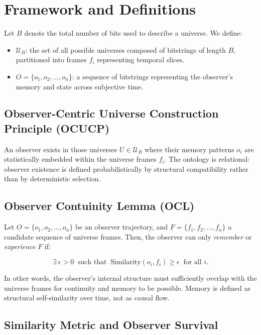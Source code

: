 \documentclass[12pt]{article}
\begin{document}
\section{Framework and Definitions}

Let $B$ denote the total number of bits used to describe a universe. We define:

\begin{itemize}
    \item $\mathcal{U}_B$: the set of all possible universes composed of bitstrings of length $B$, partitioned into frames $f_i$ representing temporal slices.
    \item $O = \{o_1, o_2, \ldots, o_n\}$: a sequence of bitstrings representing the observer's memory and state across subjective time.
\end{itemize}

\subsection{Observer-Centric Universe Construction Principle (OCUCP)}


An observer exists in those universes $U \in \mathcal{U}_B$ where their memory patterns $o_i$ are statistically embedded within the universe frames $f_i$. The ontology is relational: observer existence is defined probabilistically by structural compatibility rather than by deterministic selection.


\subsection{Observer Contuinity Lemma (OCL)}

Let $O = \{o_1, o_2, \ldots, o_n\}$ be an observer trajectory, and $F = \{f_1, f_2, \ldots, f_n\}$ a candidate sequence of universe frames. Then, the observer can only \emph{remember} or \emph{experience} $F$ if:

\[
    \exists\ \epsilon > 0\ \text{ such that }\ \text{Similarity}(o_i, f_i) \ge \epsilon\ \text{ for all } i.
\]

In other words, the observer's internal structure must sufficiently overlap with the universe frames for continuity and memory to be possible. Memory is defined as structural self-similarity over time, not as causal flow.

\subsection{Similarity Metric and Observer Survival}
\end{document}
